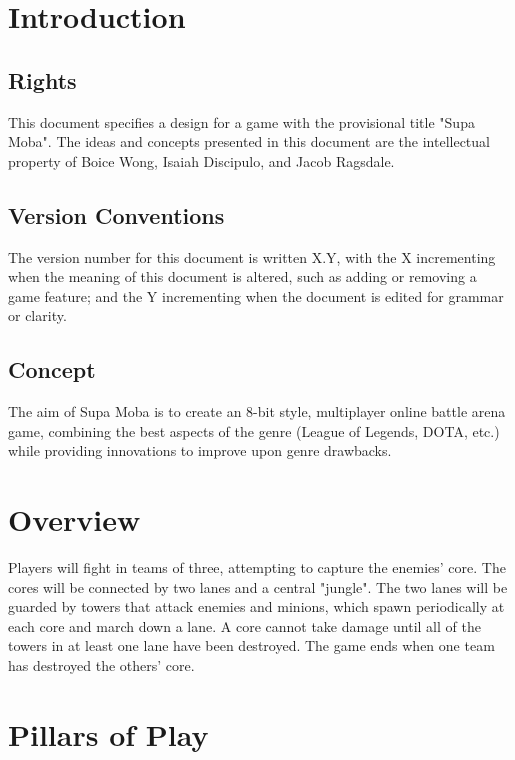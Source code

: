 \documentclass[10pt]{article}
\title{\framebox[0.8\textwidth]{Supa Moba}}
\author{v0.2\\Boice Wong\\Isaiah Discipulo\\Jacob Ragsdale}
\date{August 2019}
\begin{document}
	\clearpage\maketitle
	\thispagestyle{empty}
	\pagebreak
	
	\tableofcontents
	\pagebreak
	
	\section{Introduction}
		\subsection{Rights}
			This document specifies a design for a game with the provisional title "Supa Moba". The ideas and concepts presented in this document are the intellectual property of Boice Wong, Isaiah Discipulo, and Jacob Ragsdale.
			
		\subsection{Version Conventions}
			The version number for this document is written X.Y, with the X incrementing when the meaning of this document is altered, such as adding or removing a game feature; and the Y incrementing when the document is edited for grammar or clarity.
			
		\subsection{Concept}
			The aim of Supa Moba is to create an 8-bit style, multiplayer online battle arena game, combining the best aspects of the genre (League of Legends, DOTA, etc.) while providing innovations to improve upon genre drawbacks.
	
	\section{Overview}
		Players will fight in teams of three, attempting to capture the enemies' core. The cores will be connected by two lanes and a central "jungle". The two lanes will be guarded by towers that attack enemies and minions, which spawn periodically at each core and march down a lane. A core cannot take damage until all of the towers in at least one lane have been destroyed. The game ends when one team has destroyed the others' core. 
		
	\section{Pillars of Play}
\end{document}
